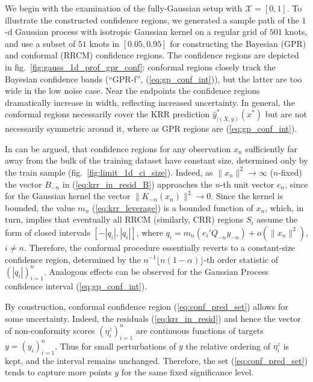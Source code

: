 \documentclass[10pt, conference, compsocconf]{IEEEtran}
\newcommand{\Xcal}{\mathcal{X}}
\newcommand{\Real}{\mathbb{R}}
\begin{document}
We begin with the examination of the fully-Gaussian setup with $\Xcal=[0, 1]$.
To illustrate the constructed confidence regions, we generated a sample path of
the $1$-d Gaussian process with isotropic Gaussian kernel on a regular grid of
$501$ knots, and use a subset of $51$ knots in $[0.05, 0.95]$ for constructing
the Bayesian (GPR) and conformal (RRCM) confidence regions. The confidence regions
are depicted in fig.~\ref{fig:gauss_1d_prof_gpr_conf}: conformal regions closely
track the Bayesian confidence bands (``GPR-f'', (\ref{eq:gp_conf_int})), but the
latter are too wide in the low noise case. Near the endpoints the confidence regions
dramatically increase in width, reflecting increased uncertainty. In general, the
conformal regions necessarily cover the KRR prediction $\hat{y}^*_{|(X, y)}(x^*)$
but are not necessarily symmetric around it, where as GPR regions are (\ref{eq:gp_conf_int}).

In can be argued, that confidence regions for any observation $x_n$ sufficiently
far away from the bulk of the training dataset have constant size, determined only
by the train sample (fig.~\ref{fig:limit_1d_ci_size}). Indeed, as $\|x_n\|^2\to \infty$
($n$-fixed) the vector $B_{-n}$ in (\ref{eq:krr_in_resid_B}) approaches the
$n$-th unit vector $e_n$, since for the Gaussian kernel the vector $\|K_{-n}(x_n)\|^2\to 0$.
Since the kernel is bounded, the value $m_n$ (\ref{eq:krr_leverage}) is a bounded
function of $x_n$, which, in turn, implies that eventually all RRCM (similarly, CRR)
regions $S_i$ assume the form of closed intervals $[-|q_i|, |q_i|]$, where
$q_i = m_n (e_i'Q_{-n}y_{-n}) + o(\|x_n\|^2)$, $i \neq n$. Therefore, the conformal
procedure essentially reverts to a constant-size confidence region, determined by
the $n^{-1}\lfloor n(1-\alpha)\rfloor$-th order statistic of $(|q_i|)_{i=1}^n$.
Analogous effects can be observed for the Gaussian Process confidence interval
(\ref{eq:gp_conf_int}).

By construction, conformal confidence region (\ref{eq:conf_pred_set}) allows
for some uncertainty. Indeed, the residuals (\ref{eq:krr_in_resid}) and hence
the vector of non-conformity scores $(\eta^z_i)_{i=1}^n$ are continuous functions
of targets $y=(y_i)_{i=1}^n$. Thus for small perturbations of $y$ the relative
ordering of $\eta^z_i$ is kept, and the interval remains unchanged. Therefore,
the set (\ref{eq:conf_pred_set}) tends to capture more points $y$ for the same
fixed significance level.
\end{document}

